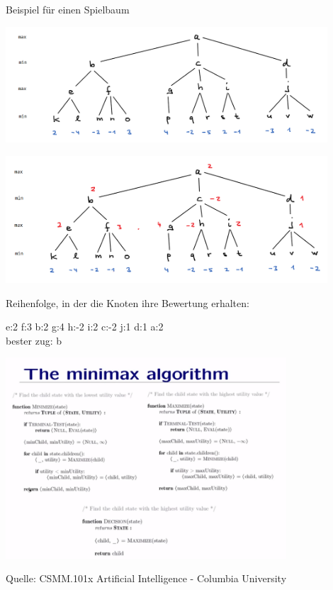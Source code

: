 \begin{frame}[fragile]
Beispiel für einen Spielbaum

\includegraphics[width=12cm]{bild10.png} 

\end{frame}

\begin{frame}[fragile]


\includegraphics[width=12cm]{bild11.png} 

Reihenfolge, in der die Knoten ihre 
Bewertung erhalten:

e:2 f:3 b:2 g:4 h:-2 i:2 c:-2 j:1 d:1 a:2 \\
bester zug: b

\end{frame}
\begin{frame}[fragile]
\includegraphics[height=7.5cm]{minmax.png}

\tiny{Quelle: CSMM.101x Artificial Intelligence - Columbia University}
\end{frame}

